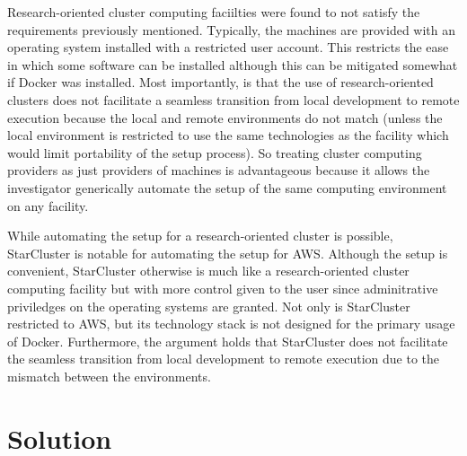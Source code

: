 Research-oriented cluster computing faciilties were found to not satisfy the requirements previously mentioned.
%
Typically, the machines are provided with an operating system installed with a restricted user account.
%
This restricts the ease in which some software can be installed although this can be mitigated somewhat if \textsf{Docker} was installed.
%
Most importantly, is that the use of research-oriented clusters does not facilitate a seamless transition from local development to remote execution because the local and remote environments do not match (unless the local environment is restricted to use the same technologies as the facility which would limit portability of the setup process).
%
So treating cluster computing providers as just providers of machines is advantageous because it allows the investigator generically automate the setup of the same computing environment on any facility.


While automating the setup for a research-oriented cluster is possible, \textsf{StarCluster} is notable for automating the setup for \textsf{AWS}.
%
Although the setup is convenient, \textsf{StarCluster} otherwise is much like a research-oriented cluster computing facility but with more control given to the user since adminitrative priviledges on the operating systems are granted.
%
Not only is \textsf{StarCluster} restricted to \textsf{AWS}, but its technology stack is not designed for the primary usage of \textsf{Docker}.
%
Furthermore, the argument holds that \textsf{StarCluster} does not facilitate the seamless transition from local development to remote execution due to the mismatch between the environments.



\section{Solution}








